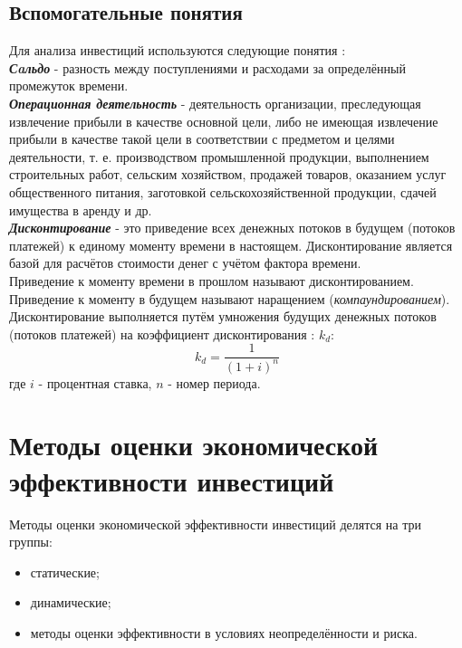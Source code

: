 \documentclass[a4paper,12pt]{article}
\begin{document}
\subsection{Вспомогательные понятия}
Для анализа инвестиций используются следующие понятия :\\

\textbf{\textit{Сaльдо}} - разность между поступлениями и расходами за определённый промежуток времени.\\

\textit{\textbf{Операционная деятельность}} - деятельность организации, преследующая извлечение прибыли в качестве основной цели, либо не имеющая извлечение прибыли в качестве такой цели в соответствии с предметом и целями деятельности, т. е. производством промышленной продукции, выполнением строительных работ, сельским хозяйством, продажей товаров, оказанием услуг общественного питания, заготовкой сельскохозяйственной продукции, сдачей имущества в аренду и др.\\

\textbf{\textit{Дисконтирование}} - это приведение всех денежных потоков в будущем (потоков платежей) к единому моменту времени в настоящем. Дисконтирование является базой для расчётов стоимости денег с учётом фактора времени.\\
Приведение к моменту времени в прошлом называют дисконтированием.
Приведение к моменту в будущем называют наращением (\textit{компаундированием}).
Дисконтирование выполняется путём умножения будущих денежных потоков (потоков платежей) на коэффициент дисконтирования : ${k_d}$:
\begin{equation}
	k_d = \frac{1}{(1+i)^n}
\end{equation}
где ${i}$ -  процентная ставка, ${n}$ - номер периода.
\newpage	    
	\section{Методы оценки экономической эффективности инвестиций}
	Методы оценки экономической эффективности инвестиций делятся
на три группы:
\begin{itemize}
\item статические;
\item динамические;
\item методы оценки эффективности в условиях неопределённости и
риска.
\end{itemize}
\end{document}
